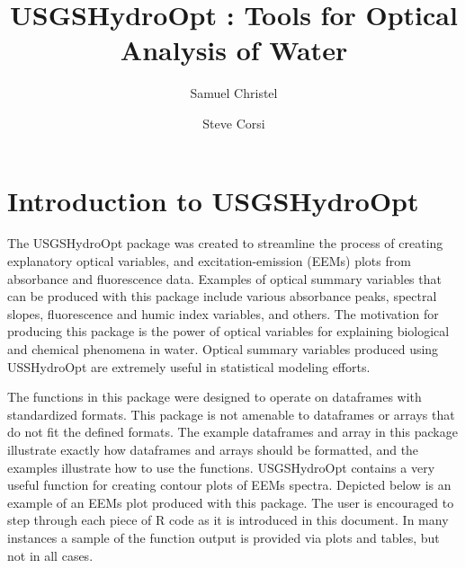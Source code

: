 \documentclass[a4paper,11pt]{article}\usepackage[]{graphicx}\usepackage[]{color}
\begin{document}
\title{USGSHydroOpt : Tools for Optical Analysis of Water}
\author[1]{Samuel Christel}
\author[1]{Steve Corsi}




\maketitle
\tableofcontents

\section{Introduction to USGSHydroOpt}
The USGSHydroOpt package was created to streamline the process of creating explanatory optical variables, and excitation-emission (EEMs) plots from absorbance and fluorescence data. Examples of optical summary variables that can be produced with this package include various absorbance peaks, spectral slopes, fluorescence and humic index variables, and others. The motivation for producing this package is the power of optical variables for explaining biological and chemical phenomena in water. Optical summary variables produced using USSHydroOpt are extremely useful in statistical modeling efforts.

The functions in this package were designed to operate on dataframes with standardized formats. This package is not amenable to dataframes or arrays that do not fit the defined formats. The example dataframes and array in this package illustrate exactly how dataframes and arrays should be formatted, and the examples illustrate how to use the functions. USGSHydroOpt contains a very useful function for creating contour plots of EEMs spectra. Depicted below is an example of an EEMs plot produced with this package. The user is encouraged to step through each piece of R code as it is introduced in this document. In many instances a sample of the function output is provided via plots and tables, but not in all cases.
\end{document}
